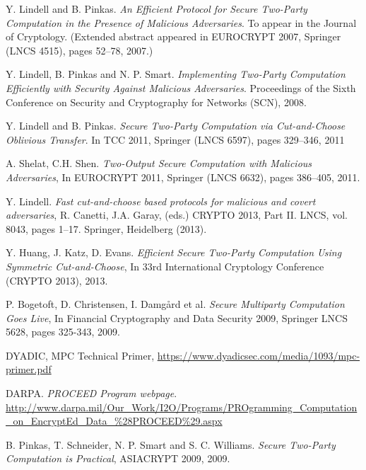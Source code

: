\documentclass[ %
                    author={Nicholas Tutte},
                supervisor={Prof. Nigel Smart},
                    degree={MEng},
                     title={Secure Two Party Computation},
                  subtitle={A practical comparison of recent protocols},
                      type={Research - GG1K},
                      year={2015} ]{dissertation}
\begin{document}
	\begin{thebibliography}{99}

			Y. Lindell and B. Pinkas. \emph{An Efficient Protocol for Secure Two-Party Computation in the Presence of Malicious Adversaries}.
			To appear in the Journal of Cryptology. (Extended abstract appeared in EUROCRYPT 2007, Springer (LNCS 4515), pages 52–78, 2007.)

			Y. Lindell, B. Pinkas and N. P. Smart.
			\emph{Implementing Two-Party Computation Efficiently with Security Against Malicious Adversaries}. Proceedings of the Sixth Conference on Security and Cryptography for Networks (SCN),
			2008.

			Y. Lindell and B. Pinkas. \emph{Secure Two-Party Computation via Cut-and-Choose Oblivious Transfer}.
			In TCC 2011,
			Springer (LNCS 6597), pages 329–346,
			2011

			A. Shelat, C.H. Shen. \emph{Two-Output Secure Computation with Malicious Adversaries},
			In EUROCRYPT 2011,
			Springer (LNCS 6632), pages 386–405,
			2011.

			Y. Lindell.
			\emph{Fast cut-and-choose based protocols for malicious and covert adversaries}, R. Canetti, J.A. Garay, (eds.)
			CRYPTO 2013, Part II. LNCS, vol. 8043, pages 1–17.
			Springer, Heidelberg (2013).

			Y. Huang, J. Katz, D. Evans.
			\emph{Efficient Secure Two-Party Computation Using Symmetric Cut-and-Choose}, In 33rd International Cryptology Conference (CRYPTO 2013),
			2013.

			P. Bogetoft, D. Christensen, I. Damgård et al.
			\emph{Secure Multiparty Computation Goes Live},
			In Financial Cryptography and Data Security 2009,
			Springer LNCS 5628, pages 325-343,
			2009.

			DYADIC,
			MPC Technical Primer,
			\url{https://www.dyadicsec.com/media/1093/mpc-primer.pdf}

			DARPA.
			\emph{PROCEED Program webpage}.
			\url{http://www.darpa.mil/Our_Work/I2O/Programs/PROgramming_Computation_on_EncryptEd_Data_%28PROCEED%29.aspx}

			
			B. Pinkas, T. Schneider, N. P. Smart and S. C. Williams.
			\emph{Secure Two-Party Computation is Practical},
			ASIACRYPT 2009, 2009.


\end{thebibliography}
\end{document}
